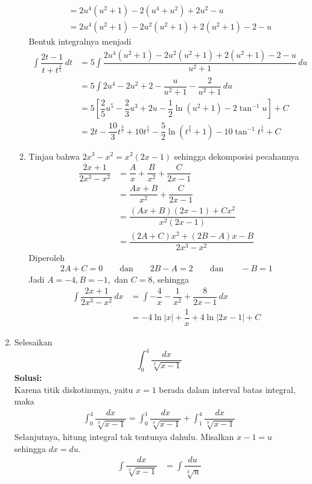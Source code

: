 \documentclass{article}
\begin{document}
\begin{enumerate}
\begin{enumerate}
\begin{align*}
		&= 2u^4(u^2+1)-2(u^4+u^2)+2u^2-u\\
		&= 2u^4(u^2+1) - 2u^2(u^2+1) + 2(u^2+1)-2 -u
		\end{align*}
		Bentuk integralnya menjadi
		\begin{align*}
		\int \dfrac{2t-1}{t+t^{\frac{3}{5}}}\, dt &= 5\int \dfrac{2u^4(u^2+1) - 2u^2(u^2+1) + 2(u^2+1)-2 -u}{u^2+1}\, du\\
		&= 5\int 2u^4-2u^2+2-\dfrac{u}{u^2+1} -\dfrac{2}{u^2+1}\, du\\
		&= 5\left[\dfrac{2}{5}u^5-\dfrac{2}{3}u^3+2u-\dfrac{1}{2}\ln(u^2+1)-2\tan^{-1}u\right] +C\\
		&= 2t - \dfrac{10}{3}t^\frac{3}{5}+10t^\frac{1}{5}-\dfrac{5}{2}\ln(t^{\frac{2}{5}}+1)-10\tan^{-1}t^\frac{1}{5} +C 
		\end{align*}
		\item Tinjau bahwa $2x^3-x^2=x^2(2x-1)$ sehingga dekomposisi pecahannya
		\begin{align*}
		\dfrac{2x+1}{2x^3-x^2} &= \dfrac{A}{x} + \dfrac{B}{x^2} + \dfrac{C}{2x-1} \\
		&= \dfrac{Ax+B}{x^2} + \dfrac{C}{2x-1}\\
		&= \dfrac{(Ax+B)(2x-1)+Cx^2}{x^2(2x-1)}\\
		&= \dfrac{(2A+C)x^2+(2B-A)x-B}{2x^3-x^2}
		\end{align*}
		Diperoleh
		\begin{align*}
		2A+C = 0 \qquad \text{dan}\qquad 2B-A=2 \qquad \text{dan}\qquad -B = 1
		\end{align*}
		Jadi $A=-4,B=-1,$ dan $C=8$, sehingga
		\begin{align*}
		\int \dfrac{2x+1}{2x^3-x^2}\, dx &= \int -\dfrac{4}{x} - \dfrac{1}{x^2} + \dfrac{8}{2x-1}\, dx\\
		&= -4\ln |x|+\dfrac{1}{x}+4\ln|2x-1| + C
		\end{align*}
	\end{enumerate}
	\item Selesaikan 
	$$ \int_0^4 \dfrac{dx}{\sqrt[3]{x-1}} $$
	\textbf{Solusi:}\\
	Karena titik diskotinunya, yaitu $x=1$ berada dalam interval batas integral, maka 
	\begin{align*}
	\int_0^4 \dfrac{dx}{\sqrt[3]{x-1}} = \int_0^1 \dfrac{dx}{\sqrt[3]{x-1}} + \int_1^4 \dfrac{dx}{\sqrt[3]{x-1}}
	\end{align*}
	Selanjutnya, hitung integral tak tentunya dahulu. Misalkan $x-1=u$ sehingga $dx = du$. 
	\begin{align*}
	\int \dfrac{dx}{\sqrt[3]{x-1}} &= \int \dfrac{du}{\sqrt[3]{u}}\\

\end{align*}
\end{enumerate}
\end{document}
